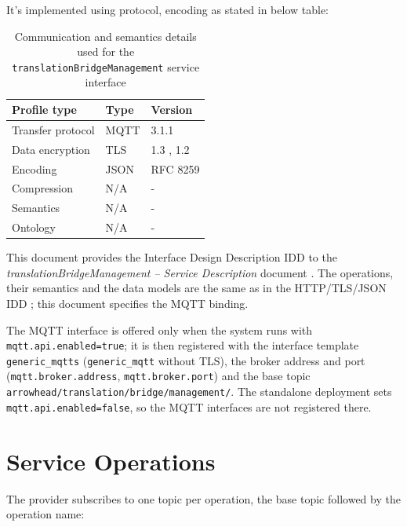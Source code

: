\documentclass[a4paper]{arrowhead}
\begin{document}
It's implemented using protocol, encoding as stated in below table:
\begin{table}[ht!]
  \centering
  \begin{tabular}{|l|l|l|}
    \hline
    \rowcolor{gray!33} Profile type & Type & Version \\ \hline
    Transfer protocol & MQTT & 3.1.1 \cite{mqtt311} \\ \hline
    Data encryption & TLS & 1.3 \cite{rfc8446}, 1.2 \cite{rfc5246} \\ \hline
    Encoding & JSON & RFC 8259 \cite{rfc8259} \\ \hline
    Compression & N/A & - \\ \hline
    Semantics & N/A & - \\ \hline
    Ontology & N/A & - \\ \hline
  \end{tabular}
  \caption{Communication and semantics details used for the \texttt{translation\allowbreak{}Bridge\allowbreak{}Management} service interface}
  \label{tab:comunication_semantics_profile}
\end{table}

This document provides the Interface Design Description IDD to the \textit{translationBridgeManagement -- Service Description} document \cite{tm-translationBridgeManagement-sd}.
The operations, their semantics and the data models are the same as in the HTTP/TLS/JSON IDD \cite{tm-translationBridgeManagement-http-idd}; this document specifies the MQTT binding.

The MQTT interface is offered only when the system runs with \texttt{mqtt.api.enabled=true}; it is then registered with the interface template \texttt{generic\_\allowbreak{}mqtts} (\texttt{generic\_\allowbreak{}mqtt} without TLS), the broker address and port (\texttt{mqtt.\allowbreak{}broker.\allowbreak{}address}, \texttt{mqtt.\allowbreak{}broker.\allowbreak{}port}) and the base topic \texttt{arrowhead/\allowbreak{}translation/\allowbreak{}bridge/\allowbreak{}management/\allowbreak{}}. The standalone deployment sets \texttt{mqtt.\allowbreak{}api.\allowbreak{}enabled=\allowbreak{}false}, so the MQTT interfaces are not registered there.

\newpage

\section{Service Operations}
\label{sec:operations}

The provider subscribes to one topic per operation, the base topic followed by the operation name:
\end{document}
